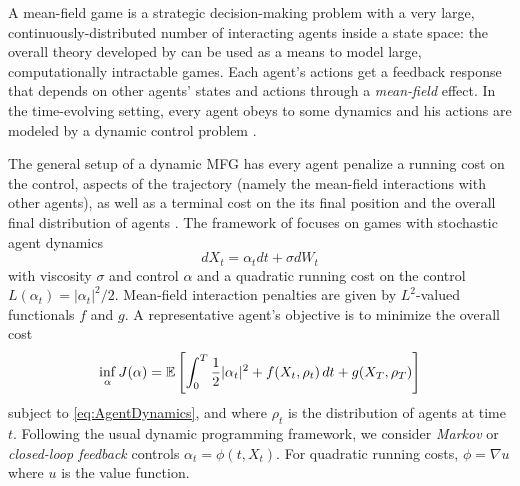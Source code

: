 \documentclass[../report.tex]{subfiles}
\begin{document}
A mean-field game \cite{LASRY2006619,LASRY2006679} is a strategic decision-making problem with a very large, continuously-distributed number of interacting agents inside a state space: the overall theory developed by \citeauthor{LASRY2006619} can be used as a means to model large, computationally intractable games. Each agent's actions get a feedback response that depends on other agents' states and actions through a \textit{mean-field} effect. In the time-evolving setting, every agent obeys to some dynamics and his actions are modeled by a dynamic control problem \cite{LASRY2006679}.

The general setup of a dynamic MFG has every agent penalize a running cost on the control, aspects of the trajectory (namely the mean-field interactions with other agents), as well as a terminal cost on the its final position and the overall final distribution of agents \cite{LASRY2006679}.
The framework of \cites{benamou:hal-01295299}{benamou2018entropy} focuses on games with stochastic agent dynamics 
\begin{equation}\label{eq:AgentDynamics}
dX_t = \alpha_tdt + \sigma dW_t
\end{equation}
with viscosity $\sigma$ and control $\alpha$ and a quadratic running cost on the control $L(\alpha_t) = |\alpha_t|^2/2$. Mean-field interaction penalties are given by $L^2$-valued functionals $f$ and $g$. A representative agent's objective is to minimize the overall cost
\begin{equation}\label{eq:ControlObjective}
	\inf_{\alpha} J(\alpha) = \mathbb{E}\left[
	\int_0^T \frac{1}{2}|\alpha_t|^2 + f(X_t, \rho_t) \,dt + g(X_T, \rho_T)
	\right]
\end{equation}
subject to \cref{eq:AgentDynamics}, and where $\rho_t$ is the distribution of agents at time $t$. Following the usual dynamic programming framework, we consider \textit{Markov} or \textit{closed-loop feedback} controls $\alpha_t = \phi(t, X_t)$. For quadratic running costs, $\phi = \nabla u$ where $u$ is the value function.
\end{document}
